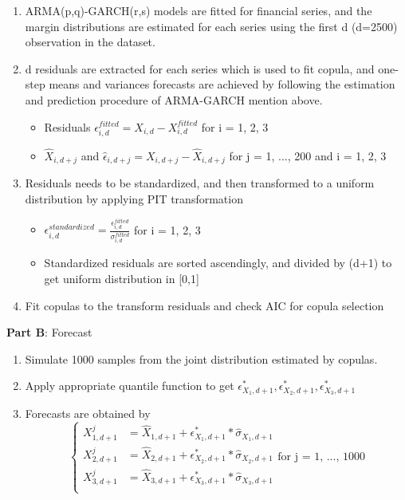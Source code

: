 \documentclass[12pt,a4paper]{article}
\numberwithin{equation}{section}
\begin{document}
 \begin{enumerate}
 \item ARMA(p,q)-GARCH(r,s) models are fitted for financial series, and the margin distributions are estimated for each series using the first d (d=2500) observation in the dataset.
 \item d residuals are extracted for each series which is used to fit copula, and one-step means and variances forecasts are achieved by following the estimation and prediction procedure of ARMA-GARCH mention above.
 	\begin{itemize}
 	\item Residuals $\epsilon_{i,d}^{fitted} = X_{i,d} - X_{i,d}^{fitted}$ for i = 1, 2, 3
 	\item $\hat{X}_{i,d+j}$ and $\hat{\epsilon}_{i,d+j} = X_{i,d+j} - \hat{X}_{i,d+j}$ for j = 1, ..., 200 and i = 1, 2, 3
 	\end{itemize}
 \item Residuals needs to be standardized, and then transformed to a uniform distribution by applying PIT transformation
 	\begin{itemize}
 	\item $\epsilon_{i,d}^{standardized} = \frac{\epsilon_{i,d}^{fitted}}{\sigma_{i,d}^{fitted}}$ for i = 1, 2, 3
 	\item Standardized residuals are sorted ascendingly, and divided by (d+1) to get uniform distribution in [0,1]
 	\end{itemize}
 \item Fit copulas to the transform residuals and check AIC for copula selection
 \end{enumerate}
 
 \textbf{Part B}: Forecast
 
 \begin{enumerate}
 \item Simulate 1000 samples from the joint distribution estimated by copulas.
 \item Apply appropriate quantile function to get $\epsilon_{X_1, d+1}^{*}, \epsilon_{X_2, d+1}^{*}, \epsilon_{X_3, d+1}^{*}$ 
 \item Forecasts are obtained by 
 \begin{equation*}
 \begin{cases}
  X_{1, d+1}^{j} &= \hat{X}_{1, d+1} + \epsilon_{X_1, d+1}^* * \hat{\sigma}_{X_1,d+1} \\
  X_{2, d+1}^{j} &= \hat{X}_{2, d+1} + \epsilon_{X_2, d+1}^* * \hat{\sigma}_{X_2,d+1} \\
  X_{3, d+1}^{j} &= \hat{X}_{3, d+1} + \epsilon_{X_3, d+1}^* * \hat{\sigma}_{X_3,d+1} \\
 \end{cases}
 \text{for j = 1, ..., 1000}
 \end{equation*}
 \end{enumerate}
 
\end{document}
